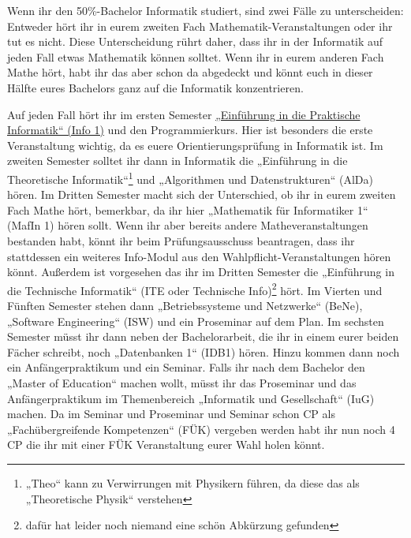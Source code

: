 \newpage{}

Wenn ihr den 50\%-Bachelor Informatik studiert, sind zwei Fälle zu unterscheiden: Entweder hört ihr in eurem zweiten Fach Ma\-the\-ma\-tik-Ver\-an\-stal\-tun\-gen oder ihr tut es nicht. Diese Unterscheidung rührt daher, dass ihr in der Informatik auf jeden Fall etwas Mathematik können solltet. Wenn ihr in eurem anderen Fach Mathe hört, habt ihr das aber schon da abgedeckt und könnt euch in dieser Hälfte eures Bachelors ganz auf die Informatik konzentrieren.

Auf jeden Fall hört ihr im ersten Semester \hyperref[info1]{„Einführung in die Praktische Informatik“ (Info 1)} und den Programmierkurs. Hier ist besonders die erste Veranstaltung wichtig, da es euere Orientierungsprüfung in Informatik ist. Im zweiten Semester solltet ihr dann in Informatik die „Einführung in die Theoretische Informatik“\footnote{„Theo“ kann zu Verwirrungen mit Physikern führen, da diese das als „Theoretische Physik“ verstehen} und „Algorithmen und Datenstrukturen“ (AlDa) hören. Im Dritten Semester macht sich der Unterschied, ob ihr in eurem zweiten Fach Mathe hört, bemerkbar, da ihr hier „Mathematik für Informatiker 1“ (MafIn 1) hören sollt. Wenn ihr aber bereits andere Matheveranstaltungen bestanden habt, könnt ihr beim Prüfungsausschuss beantragen, dass ihr stattdessen ein weiteres Info-Modul aus den Wahlpflicht-Veranstaltungen hören könnt. Außerdem ist vorgesehen das ihr im Dritten Semester die „Einführung in die Technische Informatik“ (ITE oder Technische Info)\footnote{dafür hat leider noch niemand eine schön Abkürzung gefunden} hört. Im Vierten und Fünften Semester stehen dann „Betriebssysteme und Netzwerke“ (BeNe), „Software Engineering“ (ISW) und ein Proseminar auf dem Plan. Im sechsten Semester müsst ihr dann neben der Bachelorarbeit, die ihr in einem eurer beiden Fächer schreibt, noch „Datenbanken 1“ (IDB1) hören. Hinzu kommen dann noch ein Anfängerpraktikum und ein Seminar. Falls ihr nach dem Bachelor den „Master of Education“ machen wollt, müsst ihr das Proseminar und das Anfängerpraktikum im Themenbereich „Informatik und Gesellschaft“ (IuG) machen. Da im Seminar und Proseminar und Seminar schon \gls{CP} als „Fachübergreifende Kompetenzen“ (FÜK) vergeben werden habt ihr nun noch 4 \gls{CP} die ihr mit einer FÜK Veranstaltung eurer Wahl holen könnt.

